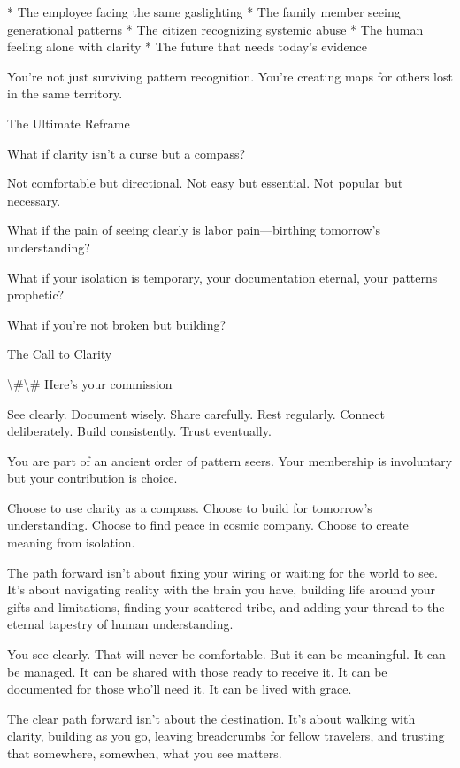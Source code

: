 \documentclass[12pt,oneside]{book}
\begin{document}
                    * The employee facing the same gaslighting
                    * The family member seeing generational patterns
                    * The citizen recognizing systemic abuse
                    * The human feeling alone with clarity
                    * The future that needs today's evidence

You're not just surviving pattern recognition. You're creating maps for others lost in the same territory.

The Ultimate Reframe

What if clarity isn't a curse but a compass?

Not comfortable but directional. Not easy but essential. Not popular but necessary.

What if the pain of seeing clearly is labor pain---birthing tomorrow's understanding?

What if your isolation is temporary, your documentation eternal, your patterns prophetic?

What if you're not broken but building?

The Call to Clarity

\textbackslash{}#\textbackslash{}# Here's your commission

See clearly. Document wisely. Share carefully. Rest regularly. Connect deliberately. Build consistently. Trust eventually.

You are part of an ancient order of pattern seers. Your membership is involuntary but your contribution is choice.

Choose to use clarity as a compass. Choose to build for tomorrow's understanding. Choose to find peace in cosmic company. Choose to create meaning from isolation.

The path forward isn't about fixing your wiring or waiting for the world to see. It's about navigating reality with the brain you have, building life around your gifts and limitations, finding your scattered tribe, and adding your thread to the eternal tapestry of human understanding.

You see clearly. That will never be comfortable. But it can be meaningful. It can be managed. It can be shared with those ready to receive it. It can be documented for those who'll need it. It can be lived with grace.

The clear path forward isn't about the destination. It's about walking with clarity, building as you go, leaving breadcrumbs for fellow travelers, and trusting that somewhere, somewhen, what you see matters.
\end{document}
